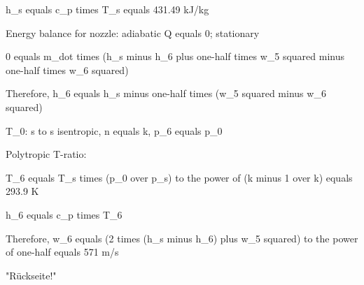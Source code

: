 h_s equals c_p times T_s equals 431.49 kJ/kg

Energy balance for nozzle: adiabatic Q equals 0; stationary

0 equals m_dot times (h_s minus h_6 plus one-half times w_5 squared minus one-half times w_6 squared)

Therefore, h_6 equals h_s minus one-half times (w_5 squared minus w_6 squared)

T_0: s to s isentropic, n equals k, p_6 equals p_0

Polytropic T-ratio:

T_6 equals T_s times (p_0 over p_s) to the power of (k minus 1 over k) equals 293.9 K

h_6 equals c_p times T_6

Therefore, w_6 equals (2 times (h_s minus h_6) plus w_5 squared) to the power of one-half equals 571 m/s

"Rückseite!"